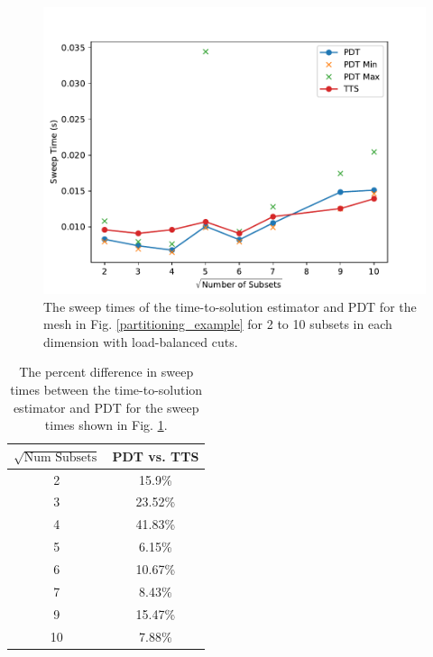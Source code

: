 \begin{figure}[ht]
  \centering
  \includegraphics[scale=0.75]{../../figures/spiderweb_lb_pdtvtts.pdf}
  \caption{The sweep times of the time-to-solution estimator and PDT for the mesh in Fig. \ref{partitioning_example} for 2 to 10 subsets in each dimension with load-balanced cuts.}
\label{comp_lb_spiderweb}
\end{figure}
\begin{table}[ht]
\centering
\caption{The percent difference in sweep times between the time-to-solution estimator and PDT for the sweep times shown in Fig. \ref{comp_lb_spiderweb}.}
\label{diff_lb_spiderweb}
\begin{tabular}{c|c}
\textbf{$\sqrt{\text{Num Subsets}}$} & \bf PDT vs. TTS \\ \hline 
2&15.9\%\\ \hline 
3&23.52\%\\ \hline 
4&41.83\%\\ \hline 
5&6.15\%\\ \hline 
6&10.67\%\\ \hline 
7&8.43\%\\ \hline 
9&15.47\%\\ \hline 
10&7.88\%
\end{tabular}
\end{table}

